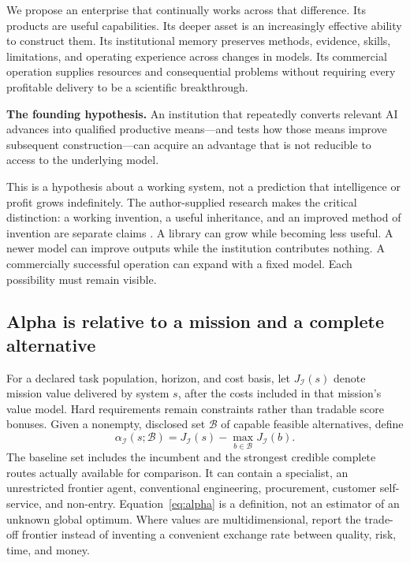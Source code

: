 \documentclass[11pt,letterpaper]{article}
\newcommand{\I}{\mathcal{I}}
\theoremstyle{remark}\newtheorem{remark}{Remark}[section]
\begin{document}
We propose an enterprise that continually works across that difference. Its products are useful capabilities. Its deeper asset is an increasingly effective ability to construct them. Its institutional memory preserves methods, evidence, skills, limitations, and operating experience across changes in models. Its commercial operation supplies resources and consequential problems without requiring every profitable delivery to be a scientific breakthrough.

\begin{thesisbox}
\textbf{The founding hypothesis.} An institution that repeatedly converts relevant AI advances into qualified productive means---and tests how those means improve subsequent construction---can acquire an advantage that is not reducible to access to the underlying model.
\end{thesisbox}

This is a hypothesis about a working system, not a prediction that intelligence or profit grows indefinitely. The author-supplied research makes the critical distinction: a working invention, a useful inheritance, and an improved method of invention are separate claims \citep{notes30,notes29}. A library can grow while becoming less useful. A newer model can improve outputs while the institution contributes nothing. A commercially successful operation can expand with a fixed model. Each possibility must remain visible.

\subsection{Alpha is relative to a mission and a complete alternative}
For a declared task population, horizon, and cost basis, let $J_{\I}(s)$ denote mission value delivered by system $s$, after the costs included in that mission's value model. Hard requirements remain constraints rather than tradable score bonuses. Given a nonempty, disclosed set $\mathcal B$ of capable feasible alternatives, define
\begin{equation}
\alpha_{\I}(s;\mathcal B)=J_{\I}(s)-\max_{b\in\mathcal B}J_{\I}(b).
\label{eq:alpha}
\end{equation}
The baseline set includes the incumbent and the strongest credible complete routes actually available for comparison. It can contain a specialist, an unrestricted frontier agent, conventional engineering, procurement, customer self-service, and non-entry. Equation~\eqref{eq:alpha} is a definition, not an estimator of an unknown global optimum. Where values are multidimensional, report the trade-off frontier instead of inventing a convenient exchange rate between quality, risk, time, and money.
\end{document}
